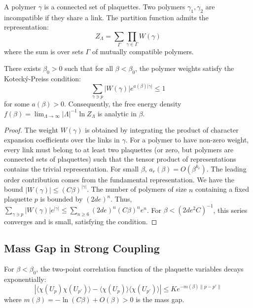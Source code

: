 \begin{definition}
A polymer $\gamma$ is a connected set of plaquettes. Two polymers $\gamma_1, \gamma_2$ are incompatible if they share a link. The partition function admits the representation:
\begin{equation}
Z_\Lambda = \sum_{\Gamma} \prod_{\gamma \in \Gamma} W(\gamma)
\end{equation}
where the sum is over sets $\Gamma$ of mutually compatible polymers.
\end{definition}

\begin{theorem}
\label{thm:cluster_convergence_app145}
There exists $\beta_0 > 0$ such that for all $\beta < \beta_0$, the polymer weights satisfy the Koteck\'y-Preiss condition:
\begin{equation}
\sum_{\gamma \ni p} |W(\gamma)| e^{a(\beta) |\gamma|} \le 1
\end{equation}
for some $a(\beta) > 0$. Consequently, the free energy density $f(\beta) = \lim_{\Lambda \to \infty} |\Lambda|^{-1} \ln Z_\Lambda$ is analytic in $\beta$.
\end{theorem}

\begin{proof}
The weight $W(\gamma)$ is obtained by integrating the product of character expansion coefficients over the links in $\gamma$. For a polymer to have non-zero weight, every link must belong to at least two plaquettes (or zero, but polymers are connected sets of plaquettes) such that the tensor product of representations contains the trivial representation.
For small $\beta$, $a_r(\beta) = O(\beta^{k_r})$. The leading order contribution comes from the fundamental representation.
We have the bound $|W(\gamma)| \le (C \beta)^{|\gamma|}$.
The number of polymers of size $n$ containing a fixed plaquette $p$ is bounded by $(2d e)^n$.
Thus, $\sum_{\gamma \ni p} |W(\gamma)| e^{|\gamma|} \le \sum_{n \ge 6} (2d e)^n (C \beta)^n e^n$.
For $\beta < (2de^2 C)^{-1}$, this series converges and is small, satisfying the condition.
\end{proof}

\subsection{Mass Gap in Strong Coupling}
\begin{theorem}
For $\beta < \beta_0$, the two-point correlation function of the plaquette variables decays exponentially:
\begin{equation}
|\langle \chi(U_p) \chi(U_{p'}) \rangle - \langle \chi(U_p) \rangle \langle \chi(U_{p'}) \rangle| \le K e^{-m(\beta) \|p - p'\|}
\end{equation}
where $m(\beta) = - \ln(C \beta) + O(\beta) > 0$ is the mass gap.
\end{theorem}

